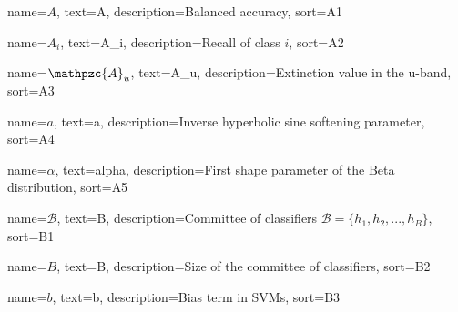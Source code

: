 

\providecommand\given{}
\DeclarePairedDelimiterXPP\E[1]{\mathbb{E}}{[}{]}{}{
	\renewcommand\given{  \nonscript\:
		\delimsize\vert
		\nonscript\:
		\mathopen{}
		\allowbreak}
	#1
}
\DeclarePairedDelimiterXPP\Prob[1]{\mathbb{P}}{(}{)}{}{
	\renewcommand\given{  \nonscript\:
		\delimsize\vert
		\nonscript\:
		\mathopen{}
		\allowbreak}
	#1
}
\DeclareMathOperator{\Beta}{Beta}
\DeclareMathOperator{\Bin}{Bin}
\DeclareMathOperator{\arsinh}{arsinh}
\DeclareMathOperator{\tr}{tr}
\newcommand{\A}{\mathpzc{A}}
\newcommand{\B}{\mathcal{B}}
\newcommand{\X}{\mathcal{X}}
\newcommand{\Y}{\mathcal{Y}}
\newcommand{\Ecal}{\mathcal{E}}
\newcommand{\Normal}{\mathcal{N}}
\newcommand{\Unlabelled}{\mathcal{U}}
\newcommand{\Labelled}{\mathcal{L}}
\newcommand{\R}{\mathcal{R}}
\newcommand*{\argmin}{\operatornamewithlimits{argmin}\limits}
\newcommand*{\argmax}{\operatornamewithlimits{argmax}\limits}


%
{%
    name={$A$},
    text={A},
    description={Balanced accuracy},
    sort={A1}
}

%
{%
    name={$A_i$},
    text={A_i},
    description={Recall of class $i$},
    sort={A2}
}


%
{%
	name={$\A_u$},
	text={A_u},
	description={Extinction value in the u-band},
	sort={A3}
}

%
{%
    name={$a$},
    text={a},
    description={Inverse hyperbolic sine softening parameter},
    sort={A4}
}

%
{%
    name={$\alpha$},
    text={alpha},
    description={First shape parameter of the Beta distribution},
    sort={A5}
}

%
{%
    name={$\B$},
    text={B},
    description={Committee of classifiers $\B = \{h_1, h_2, ..., h_B\}$},
    sort={B1}
}

%
{%
    name={$B$},
    text={B},
    description={Size of the committee of classifiers},
    sort={B2}
}

%
{%
    name={$b$},
    text={b},
    description={Bias term in SVMs},
    sort={B3}
}

